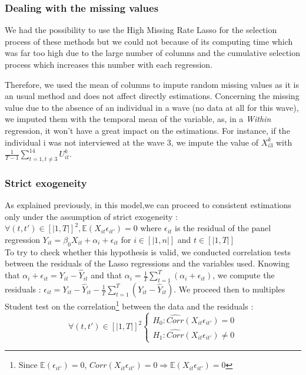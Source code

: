 \documentclass[]{article}
\begin{document}
\subsubsection{Dealing with the missing values}


We had the possibility to use the High Missing Rate Lasso for the selection process of these methods but we could not because of its computing time which was far too high due to the large number of columns and the cumulative selection process which increases this number with each regression.

Therefore, we used the mean of columns to impute random missing values as it is an usual method and does not affect directly estimations. Concerning the missing value due to the absence of an individual in a wave (no data at all for this wave), we imputed them with the temporal mean of the variable, as, in a \textit{Within} regression, it won't have a great impact on the estimations. For instance, if the individual i was not interviewed at the wave 3, we impute the value of ${X}_{i3}^k$ with $\frac{1}{T-1} \sum_{t=1, t \ne 3}^{14} U_{it}^k$. 

\subsubsection{Strict exogeneity}

As explained previously, in this model,we can proceed to consistent estimations only under the assumption of strict exogeneity : $\forall (t,t')\in [|1,T|]^2, \mathbb{E}(X_{it}\epsilon_{it'}) = 0$ where $\epsilon_{it}$ is the residual of the panel regression ${Y}_{it} = \beta_0 {X}_{it} + \alpha_i + \epsilon_{it}$ for  $i \in [|1,n|]$ and $ t \in [|1,T|]$ \\

To try to check whether this hypothesis is valid, we conducted correlation tests between the residuals of the Lasso regressions and the variables used. Knowing that $\alpha_i + \epsilon_{it} = {Y}_{it} - \hat{Y}_{it}$ and that $\alpha_i = \frac{1}{T} \sum_{t=1}^T (\alpha_i + \epsilon_{it} )$, we compute the residuals : $\epsilon_{it} = {Y}_{it} - \hat{Y}_{it} - \frac{1}{T} \sum_{t=1}^T ({Y}_{it} - \hat{Y}_{it} )$. We proceed then to multiples Student test on the correlation\footnote{Since $\mathbb{E}(\epsilon_{it'}) = 0$, $Corr(X_{it}\epsilon_{it'}) = 0 \Longrightarrow \mathbb{E}(X_{it}\epsilon_{it'}) = 0$} between the data and the residuals : $$\forall (t,t')\in [|1,T|]^2\left\{
    \begin{array}{ll}
        H_0 : \widehat{Corr}(X_{it}\epsilon_{it'}) = 0\\
        H_1 : \widehat{Corr}(X_{it}\epsilon_{it'}) \ne 0
    \end{array}
\right.$$
\end{document}
